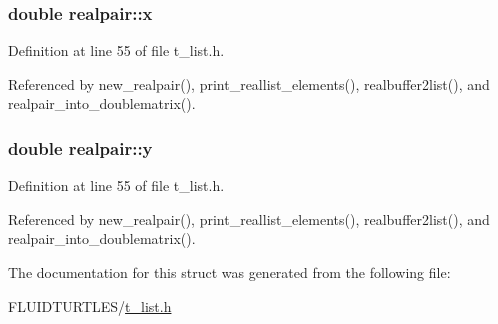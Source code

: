 \hypertarget{structrealpair_a110bbac8d66e38f6859091feaef0ed10}{
\subsubsection[{x}]{\setlength{\rightskip}{0pt plus 5cm}double realpair\-::x}}\label{structrealpair_a110bbac8d66e38f6859091feaef0ed10}


Definition at line 55 of file t\-\_\-list.\-h.



Referenced by new\-\_\-realpair(), print\-\_\-reallist\-\_\-elements(), realbuffer2list(), and realpair\-\_\-into\-\_\-doublematrix().

\hypertarget{structrealpair_a3a0afaddf0ea65c8912d10ac76224768}{
\subsubsection[{y}]{\setlength{\rightskip}{0pt plus 5cm}double realpair\-::y}}\label{structrealpair_a3a0afaddf0ea65c8912d10ac76224768}


Definition at line 55 of file t\-\_\-list.\-h.



Referenced by new\-\_\-realpair(), print\-\_\-reallist\-\_\-elements(), realbuffer2list(), and realpair\-\_\-into\-\_\-doublematrix().



The documentation for this struct was generated from the following file\-:\begin{DoxyCompactItemize}
\item 
F\-L\-U\-I\-D\-T\-U\-R\-T\-L\-E\-S/\hyperlink{t__list_8h}{t\-\_\-list.\-h}\end{DoxyCompactItemize}
